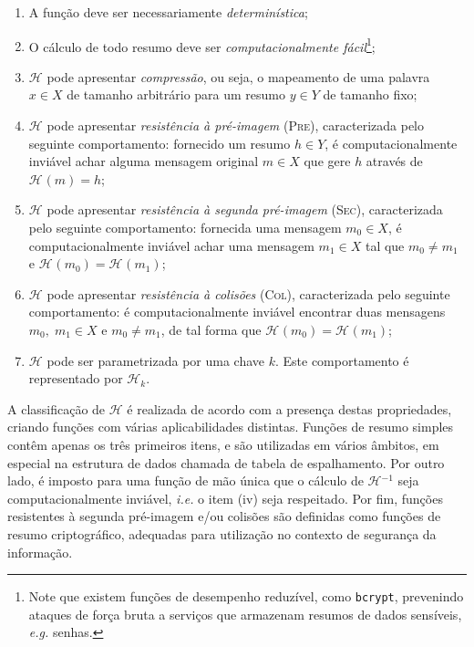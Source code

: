 \documentclass{ufsctex/ufsctex}
\newcommand{\hh}{\mathcal{H}}
\newcommand{\hash}[2][]{\mathcal{H}^{#1} (#2)}
\begin{document}
\begin{enumerate}[label= (\roman*)]

  \item A função deve ser necessariamente \emph{determinística};

  \item O cálculo de todo resumo deve ser \emph{computacionalmente
      fácil}\footnote{Note que existem funções de desempenho reduzível, como
        \texttt{bcrypt}, prevenindo ataques de força bruta a serviços que
        armazenam resumos de dados sensíveis, \emph{e.g.} senhas.};

  \item $\hh{}$ pode apresentar \emph{compressão}, ou seja, o mapeamento de uma
      palavra $x \in X$ de tamanho arbitrário para um resumo $y \in Y$ de
        tamanho fixo;

  \item $\hh{}$ pode apresentar \emph{resistência à pré-imagem} (\textsc{Pre}),
      caracterizada pelo seguinte comportamento: fornecido um resumo $h \in Y$,
        é computacionalmente inviável achar alguma mensagem original $m \in X$
        que gere $h$ através de $\hash{m} = h$;

  \item $\hh{}$ pode apresentar \emph{resistência à segunda pré-imagem}
      (\textsc{Sec}), caracterizada pelo seguinte comportamento: fornecida uma
        mensagem $m_{0} \in X$, é computacionalmente inviável achar uma
        mensagem $m_{1} \in X$ tal que $m_{0} \neq m_{1}$ e $\hash{m_{0}} =
        \hash{m_{1}}$;

  \item $\hh{}$ pode apresentar \emph{resistência à colisões} (\textsc{Col}),
      caracterizada pelo seguinte comportamento: é computacionalmente inviável
        encontrar duas mensagens $m_{0}, \; m_{1} \in X$ e $m_{0} \neq m_{1}$,
        de tal forma que $\hash{m_{0}} = \hash{m_{1}}$;

  \item $\hh{}$ pode ser parametrizada por uma chave $k$. Este comportamento é
      representado por $\hh{}_{k}$.

\end{enumerate}

A classificação de $\hh{}$ é realizada de acordo com a presença destas
propriedades, criando funções com várias aplicabilidades distintas. Funções de
resumo simples contêm apenas os três primeiros itens, e são utilizadas em
vários âmbitos, em especial na estrutura de dados chamada de tabela de
espalhamento. Por outro lado, é imposto para uma função de mão única que o
cálculo de $\hh{}^{-1}$ seja computacionalmente inviável, \emph{i.e.} o item
(iv) seja respeitado. Por fim, funções resistentes à segunda pré-imagem e/ou
colisões são definidas como funções de resumo criptográfico, adequadas para
utilização no contexto de segurança da informação.
\end{document}
